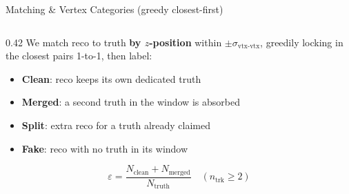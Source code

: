 \documentclass[xcolor=table,aspectratio=169]{beamer}
\newcommand{\ntrk}{\ensuremath{n_\mathrm{trk}}}
\begin{document}
\begin{frame}{Matching \& Vertex Categories (greedy closest-first)}
    \begin{columns}[c]
        \begin{column}{0.42\linewidth}
            \footnotesize
            We match reco to truth \textbf{by $z$-position} within $\pm\sigma_{\text{vtx-vtx}}$,
            greedily locking in the closest pairs 1-to-1, then label:
            \begin{itemize}\setlength\itemsep{0.35em}
                \item \textcolor{mygreen!70!black}{\textbf{Clean}}: reco keeps its own dedicated truth
                \item \textcolor{myorange!85!black}{\textbf{Merged}}: a second truth in the window is absorbed
                \item \textcolor{myblue}{\textbf{Split}}: extra reco for a truth already claimed
                \item \textcolor{myred}{\textbf{Fake}}: reco with no truth in its window
            \end{itemize}
            \vspace{0.2em}
            \[\varepsilon = \frac{N_\text{clean}+N_\text{merged}}{N_\text{truth}}\quad(\ntrk\geq2)\]
            \vspace{-0.6em}


\end{column}
\end{columns}
\end{frame}
\end{document}
